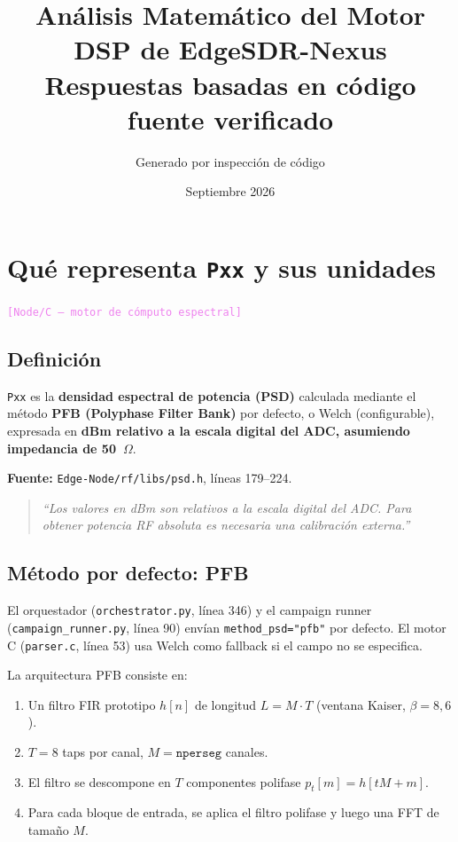 \documentclass[11pt,a4paper]{article}
\title{\textbf{Análisis Matemático del Motor DSP de EdgeSDR-Nexus}\\\large Respuestas basadas en código fuente verificado}
\author{Generado por inspección de código}
\date{Septiembre 2026}
\newcommand{\where}[1]{\textcolor{violet}{\texttt{[#1]}}}
\begin{document}
\maketitle
\tableofcontents
\newpage

\section{Qué representa \texttt{Pxx} y sus unidades}
\label{sec:pxx}

\where{Node/C — motor de cómputo espectral}

\subsection{Definición}

\texttt{Pxx} es la \textbf{densidad espectral de potencia (PSD)} calculada mediante el método \textbf{PFB (Polyphase Filter Bank)} por defecto, o Welch (configurable), expresada en \textbf{dBm relativo a la escala digital del ADC, asumiendo impedancia de 50~$\Omega$}.

\textbf{Fuente:} \texttt{Edge-Node/rf/libs/psd.h}, líneas 179--224.

\begin{quote}
\small\textit{``Los valores en dBm son relativos a la escala digital del ADC. Para obtener potencia RF absoluta es necesaria una calibración externa.''}
\end{quote}

\subsection{Método por defecto: PFB}

El orquestador (\texttt{orchestrator.py}, línea 346) y el campaign runner (\texttt{campaign\_runner.py}, línea 90) envían \texttt{method\_psd="pfb"} por defecto. El motor C (\texttt{parser.c}, línea 53) usa Welch como fallback si el campo no se especifica.

La arquitectura PFB consiste en:
\begin{enumerate}
\item Un filtro FIR prototipo $h[n]$ de longitud $L = M \cdot T$ (ventana Kaiser, $\beta = 8{,}6$).
\item $T = 8$ taps por canal, $M = \texttt{nperseg}$ canales.
\item El filtro se descompone en $T$ componentes polifase $p_t[m] = h[tM + m]$.
\item Para cada bloque de entrada, se aplica el filtro polifase y luego una FFT de tamaño $M$.
\end{enumerate}
\end{document}
